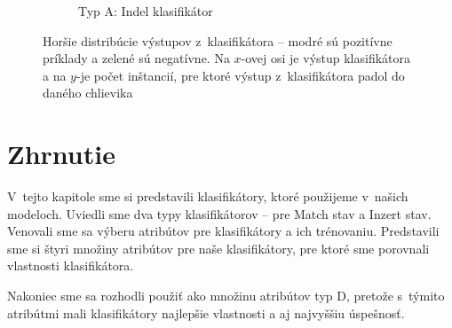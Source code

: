 \begin{figure}[htbp]
\begin{subfigure}[t]{0.4\textwidth}
                \caption{Typ A: Indel klasifikátor}
                \label{fig:datatype1-out-i}
        \end{subfigure}
        \caption[Horšie distribúcie výstupov z~klasifikátora]{Horšie distribúcie výstupov z~klasifikátora -- modré sú pozitívne príklady a zelené sú negatívne. Na $x$-ovej osi je výstup klasifikátora a na $y$-je počet inštancií, pre ktoré výstup z~klasifikátora padol do daného chlievika}
        \label{fig:datatype-bad-out}
\end{figure}

\FloatBarrier
\section{Zhrnutie}

V~tejto kapitole sme si predstavili klasifikátory, ktoré použijeme v~našich modeloch. Uviedli sme dva typy klasifikátorov -- pre Match stav a Inzert stav. Venovali sme sa výberu atribútov pre klasifikátory a ich trénovaniu. Predstavili sme si štyri množiny atribútov pre naše klasifikátory, pre ktoré sme porovnali vlastnosti klasifikátora.

Nakoniec sme sa rozhodli použiť ako množinu atribútov typ D, pretože s~týmito atribútmi mali klasifikátory najlepšie vlastnosti a aj najvyššiu úspešnosť.
